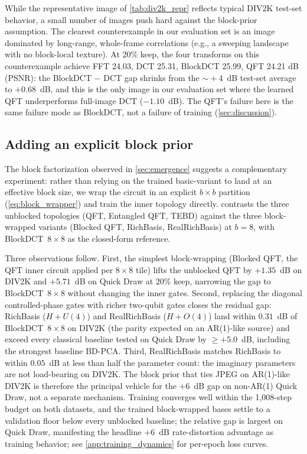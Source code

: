 \documentclass[a4paper, twocolumn]{quantumarticle}
\newcommand{\eg}{e.g.,\xspace}
\begin{document}
While the representative image of \cref{tab:div2k_repr} reflects typical DIV2K test-set behavior, a small number of images push hard against the block-prior assumption.
The clearest counterexample in our evaluation set is an image dominated by long-range, whole-frame correlations (\eg a sweeping landscape with no block-local texture).
At 20\% keep, the four transforms on this counterexample achieve FFT 24.03, DCT 25.31, BlockDCT 25.99, QFT 24.21 dB (PSNR): the BlockDCT $-$ DCT gap shrinks from the $\sim\!+4$~dB test-set average to $+0.68$~dB, and this is the only image in our evaluation set where the learned QFT underperforms full-image DCT ($-1.10$~dB).
The QFT's failure here is the same failure mode as BlockDCT, not a failure of training (\cref{sec:discussion}).

\subsection{Adding an explicit block prior}
\label{sec:blockprior_results}

The block factorization observed in \cref{sec:emergence} suggests a complementary experiment: rather than relying on the trained basic-variant to land at an effective block size, we wrap the circuit in an explicit $b \times b$ partition (\cref{eq:block_wrapper}) and train the inner topology directly.
 contrasts the three unblocked topologies (QFT, Entangled QFT, TEBD) against the three block-wrapped variants (Blocked QFT, RichBasis, RealRichBasis) at $b = 8$, with BlockDCT~$8 \times 8$ as the closed-form reference.

Three observations follow.
First, the simplest block-wrapping (Blocked QFT, the QFT inner circuit applied per $8 \times 8$ tile) lifts the unblocked QFT by $+1.35$~dB on DIV2K and $+5.71$~dB on Quick Draw at $20\%$ keep, narrowing the gap to BlockDCT~$8 \times 8$ without changing the inner gates.
Second, replacing the diagonal controlled-phase gates with richer two-qubit gates closes the residual gap: RichBasis ($H + U(4)$) and RealRichBasis ($H + O(4)$) land within $0.31$~dB of BlockDCT~$8 \times 8$ on DIV2K (the parity expected on an AR(1)-like source) and exceed every classical baseline tested on Quick Draw by $\ge +5.0$~dB, including the strongest baseline BD-PCA.
Third, RealRichBasis matches RichBasis to within $0.05$~dB at less than half the parameter count: the imaginary parameters are not load-bearing on DIV2K.
The block prior that ties JPEG on AR(1)-like DIV2K is therefore the principal vehicle for the $+6$~dB gap on non-AR(1) Quick Draw, not a separate mechanism.
Training converges well within the 1{,}008-step budget on both datasets, and the trained block-wrapped bases settle to a validation floor below every unblocked baseline; the relative gap is largest on Quick Draw, manifesting the headline $+6$~dB rate-distortion advantage as training behavior; see \cref{app:training_dynamics} for per-epoch loss curves.
\end{document}
